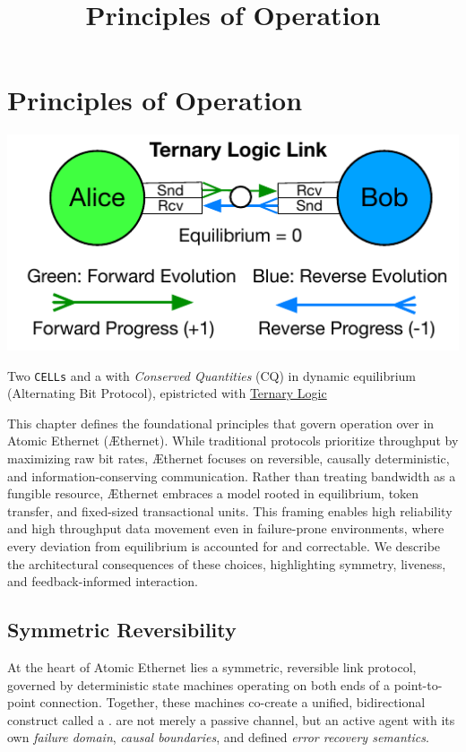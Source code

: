 \documentclass[../OAE-SPEC-MAIN.tex]{subfiles}
\title{Principles of Operation}
\begin{document}
\chapter{Principles of Operation}\label{sec:principles-of-operation}

\begin{marginfigure}	%
\centering
   \includegraphics[width=1.15\textwidth]{./figures/ternary-link.pdf}
\caption{\centering Two \texttt{CELLs} and a \LINK with \emph{Conserved Quantities} (CQ) in dynamic equilibrium (Alternating Bit Protocol), epistricted with \href{https://en.wikipedia.org/wiki/Three-valued_logic}{Ternary Logic}}%
\label{fig:LINK}
\end{marginfigure}

This chapter defines the foundational principles that govern operation over \LINKs in Atomic Ethernet (\AE thernet). While traditional protocols prioritize throughput by maximizing raw bit rates, \AE thernet focuses on reversible, causally deterministic, and information-conserving communication. Rather than treating bandwidth as a fungible resource, \AE thernet embraces a model rooted in equilibrium, token transfer, and fixed-sized transactional units. This framing enables high reliability and high throughput data movement even in failure-prone environments, where every deviation from equilibrium is accounted for and correctable. We describe the architectural consequences of these choices, highlighting symmetry, liveness, and feedback-informed interaction.






\section{Symmetric Reversibility}

At the heart of Atomic Ethernet lies a symmetric, reversible link protocol, governed by deterministic state machines operating on both ends of a point-to-point connection. Together, these machines co-create a unified, bidirectional construct called a \LINK. \LINKs are not merely a passive channel, but an active agent with its own \textit{failure domain}, \textit{causal boundaries}, and defined \textit{error recovery semantics}.
\end{document}
